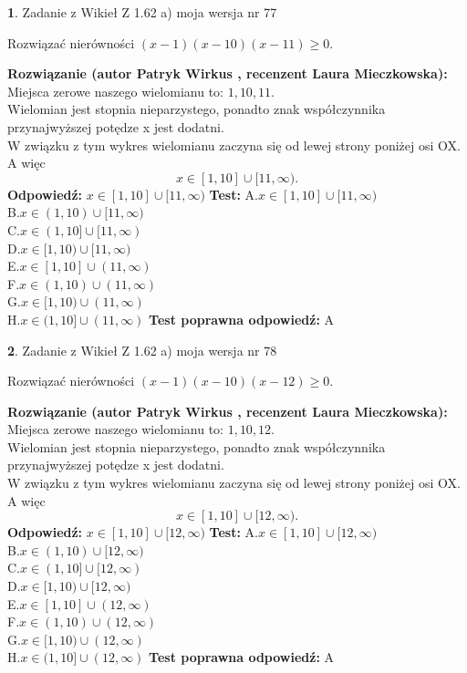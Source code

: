 \documentclass[12pt, a4paper]{article}
\theoremstyle{definition} %
\newtheorem{zad}{}
\newcommand{\zadStart}[1]{\begin{zad}#1\newline}
\newcommand{\zadStop}{\end{zad}}
\newcommand{\rozwStart}[2]{\noindent \textbf{Rozwiązanie (autor #1 , recenzent #2): }\newline}
\newcommand{\rozwStop}{\newline}
\newcommand{\odpStart}{\noindent \textbf{Odpowiedź:}\newline}
\newcommand{\odpStop}{\newline}
\newcommand{\testStart}{\noindent \textbf{Test:}\newline}
\newcommand{\testStop}{\newline}
\newcommand{\kluczStart}{\noindent \textbf{Test poprawna odpowiedź:}\newline}
\newcommand{\kluczStop}{\newline}
\begin{document}
\zadStart{Zadanie z Wikieł Z 1.62 a) moja wersja nr 77}

Rozwiązać nierówności $(x-1)(x-10)(x-11)\ge0$.
\zadStop
\rozwStart{Patryk Wirkus}{Laura Mieczkowska}
Miejsca zerowe naszego wielomianu to: $1, 10, 11$.\\
Wielomian jest stopnia nieparzystego, ponadto znak współczynnika przy\linebreak najwyższej potędze x jest dodatni.\\ W związku z tym wykres wielomianu zaczyna się od lewej strony poniżej osi OX. A więc $$x \in [1,10] \cup [11,\infty).$$
\rozwStop
\odpStart
$x \in [1,10] \cup [11,\infty)$
\odpStop
\testStart
A.$x \in [1,10] \cup [11,\infty)$\\
B.$x \in (1,10) \cup [11,\infty)$\\
C.$x \in (1,10] \cup [11,\infty)$\\
D.$x \in [1,10) \cup [11,\infty)$\\
E.$x \in [1,10] \cup (11,\infty)$\\
F.$x \in (1,10) \cup (11,\infty)$\\
G.$x \in [1,10) \cup (11,\infty)$\\
H.$x \in (1,10] \cup (11,\infty)$
\testStop
\kluczStart
A
\kluczStop



\zadStart{Zadanie z Wikieł Z 1.62 a) moja wersja nr 78}

Rozwiązać nierówności $(x-1)(x-10)(x-12)\ge0$.
\zadStop
\rozwStart{Patryk Wirkus}{Laura Mieczkowska}
Miejsca zerowe naszego wielomianu to: $1, 10, 12$.\\
Wielomian jest stopnia nieparzystego, ponadto znak współczynnika przy\linebreak najwyższej potędze x jest dodatni.\\ W związku z tym wykres wielomianu zaczyna się od lewej strony poniżej osi OX. A więc $$x \in [1,10] \cup [12,\infty).$$
\rozwStop
\odpStart
$x \in [1,10] \cup [12,\infty)$
\odpStop
\testStart
A.$x \in [1,10] \cup [12,\infty)$\\
B.$x \in (1,10) \cup [12,\infty)$\\
C.$x \in (1,10] \cup [12,\infty)$\\
D.$x \in [1,10) \cup [12,\infty)$\\
E.$x \in [1,10] \cup (12,\infty)$\\
F.$x \in (1,10) \cup (12,\infty)$\\
G.$x \in [1,10) \cup (12,\infty)$\\
H.$x \in (1,10] \cup (12,\infty)$
\testStop
\kluczStart
A
\kluczStop
\end{document}
